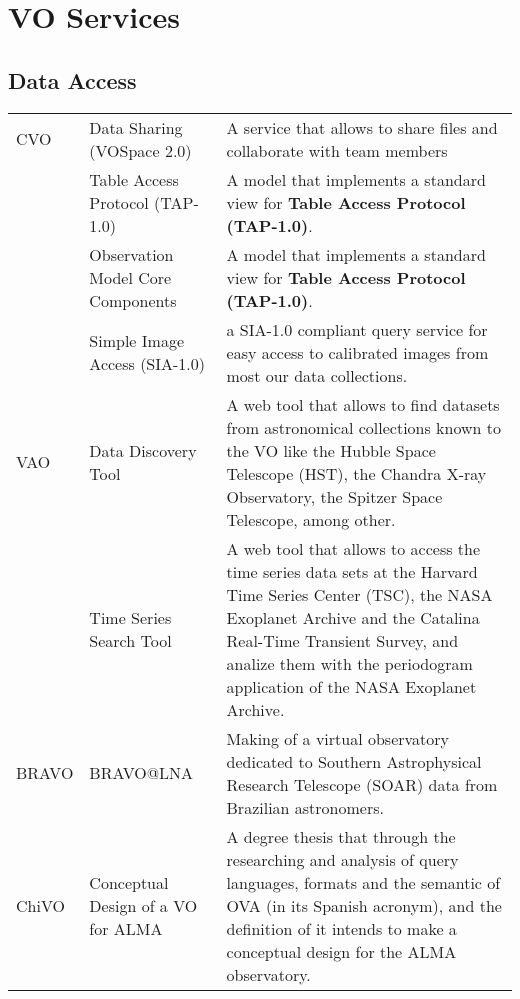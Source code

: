 \section{VO Services}
\subsection{Data Access}
\begin{table*}[h!t]
	\centering
	\begin{tabular}{|l|l|p{12.5cm}|}
	\hline
	CVO 	& Data Sharing (VOSpace 2.0) &  A service that allows to share files and collaborate with team members \\
			& Table Access Protocol (TAP-1.0) &	A model that implements a standard view for \textbf{Table Access Protocol (TAP-1.0)}. \\
			& Observation Model Core Components & A model that implements a standard view for \textbf{Table Access Protocol (TAP-1.0)}. \\
			& Simple Image Access (SIA-1.0) & a SIA-1.0 compliant query service for easy access to calibrated images from most our data collections. \\
	\hline
	VAO		& Data Discovery Tool & A web tool that allows to find datasets from astronomical collections known to the VO like the Hubble Space Telescope 
									(HST), the Chandra X-ray Observatory, the Spitzer Space Telescope, among other.\\
			& Time Series Search Tool & A web tool that allows to access the time series data sets at the Harvard Time Series Center (TSC), the NASA 
									Exoplanet Archive and the Catalina Real-Time Transient Survey, and analize them with the periodogram application 
									of the NASA Exoplanet Archive.\\
	\hline
	BRAVO	& BRAVO@LNA & Making of a virtual observatory dedicated to Southern Astrophysical Research Telescope (SOAR) data from Brazilian astronomers.  \\
	\hline
	ChiVO	& Conceptual Design of a VO for ALMA & A degree thesis that through the researching and analysis of query 
									languages, formats and the semantic of OVA (in its Spanish acronym), and the definition of it intends to make a 
									conceptual design for the ALMA observatory.\\

\end{tabular}
\end{table*}
